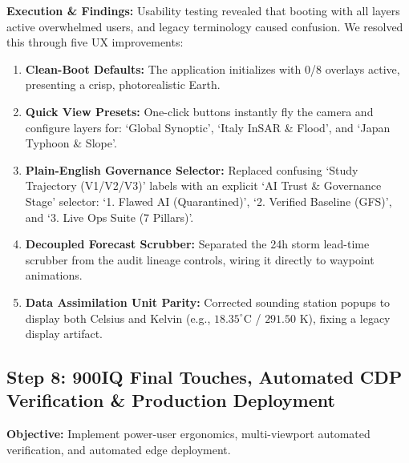 \documentclass[10pt,twocolumn,letterpaper]{article}
\begin{document}
\textbf{Execution \& Findings:} Usability testing revealed that booting with all layers active overwhelmed users, and legacy terminology caused confusion. We resolved this through five UX improvements:
\begin{enumerate}[leftmargin=*,noitemsep,topsep=1pt]
    \item \textbf{Clean-Boot Defaults:} The application initializes with 0/8 overlays active, presenting a crisp, photorealistic Earth.
    \item \textbf{Quick View Presets:} One-click buttons instantly fly the camera and configure layers for: `Global Synoptic', `Italy InSAR \& Flood', and `Japan Typhoon \& Slope'.
    \item \textbf{Plain-English Governance Selector:} Replaced confusing `Study Trajectory (V1/V2/V3)' labels with an explicit `AI Trust \& Governance Stage' selector: `1. Flawed AI (Quarantined)', `2. Verified Baseline (GFS)', and `3. Live Ops Suite (7 Pillars)'.
    \item \textbf{Decoupled Forecast Scrubber:} Separated the 24h storm lead-time scrubber from the audit lineage controls, wiring it directly to waypoint animations.
    \item \textbf{Data Assimilation Unit Parity:} Corrected sounding station popups to display both Celsius and Kelvin (e.g., $18.35^\circ\text{C}$ / $291.50\text{ K}$), fixing a legacy display artifact.
\end{enumerate}

\subsection{Step 8: 900IQ Final Touches, Automated CDP Verification \& Production Deployment}
\textbf{Objective:} Implement power-user ergonomics, multi-viewport automated verification, and automated edge deployment.
\end{document}
